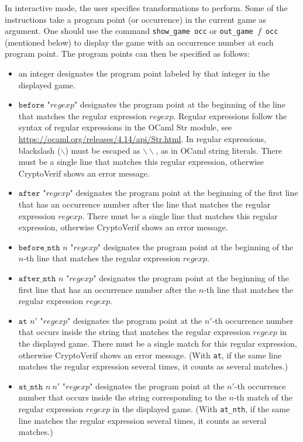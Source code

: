\documentclass{article}
\begin{document}
In interactive mode, the user specifies transformations to perform.
Some of the instructions take a program point (or occurrence)
in the current game as argument.
One should use the command \texttt{show\string_game occ}
or \texttt{out\string_game $f$ occ} (mentioned below) to
display the game with an occurrence number at each program point.
The program points can then be specified as follows:
\begin{itemize}
\item an integer designates the program point labeled by that integer in
  the displayed game.
\item $\texttt{before "}\mathit{regexp}\texttt{"}$ designates the program
  point at the beginning of the line that matches the regular expression
  $\mathit{regexp}$. Regular expressions follow the syntax of regular expressions in the OCaml Str module, see
  \url{https://ocaml.org/releases/4.14/api/Str.html}.
  In regular expressions, blackslash ($\backslash$) must be escaped as $\backslash\backslash$, as in OCaml string literals.
  There must be a single line that matches this
  regular expression, otherwise CryptoVerif shows an error message.
  
\item $\texttt{after "}\mathit{regexp}\texttt{"}$ designates the program
  point at the beginning of the first line that has an occurrence number after 
  the line that matches the regular expression
  $\mathit{regexp}$. 
  There must be a single line that matches this
  regular expression, otherwise CryptoVerif shows an error message.

\item $\texttt{before\_nth }n\texttt{ "}\mathit{regexp}\texttt{"}$ designates the program
  point at the beginning of the $n$-th line that matches the regular expression
  $\mathit{regexp}$.  
  
\item $\texttt{after\_nth }n\texttt{ "}\mathit{regexp}\texttt{"}$
  designates the program point at the beginning of the first line
  that has an occurrence number after 
  the $n$-th line that matches the regular expression
  $\mathit{regexp}$.

\item $\texttt{at }n'\texttt{ "}\mathit{regexp}\texttt{"}$
  designates the program point at the $n'$-th occurrence number
  that occurs inside the string that matches the regular expression
  $\mathit{regexp}$ in the displayed game.
  There must be a single match for this
  regular expression, otherwise CryptoVerif shows an error message.
  (With \texttt{at}, if the same line matches the regular expression
  several times, it counts as several matches.)

\item $\texttt{at\_nth }n\ n'\texttt{ "}\mathit{regexp}\texttt{"}$
  designates the program point at the $n'$-th occurrence number
  that occurs inside the string corresponding to the
  $n$-th match of the regular expression
  $\mathit{regexp}$ in the displayed game.
  (With \texttt{at\_nth}, if the same line matches the regular expression
  several times, it counts as several matches.)

\end{itemize}
\end{document}
